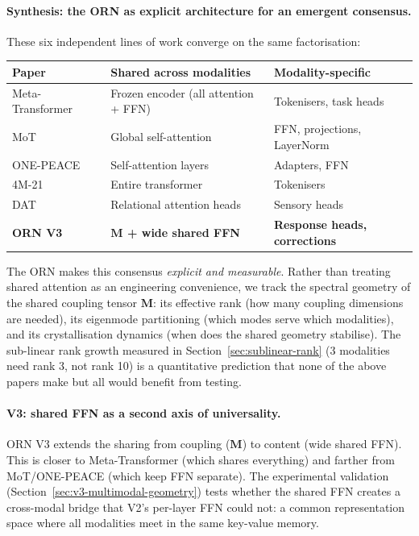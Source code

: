 \documentclass[11pt, a4paper]{article}
\newcommand{\M}{\mathbf{M}}
\theoremstyle{plain}
\theoremstyle{remark}
\begin{document}
\paragraph{Synthesis: the ORN as explicit architecture for an emergent consensus.}
These six independent lines of work converge on the same factorisation:
\begin{center}\small
\begin{tabular}{@{}lll@{}}
\toprule
\textbf{Paper} & \textbf{Shared across modalities} & \textbf{Modality-specific} \\
\midrule
Meta-Transformer~\cite{zhang2023metatransformer} & Frozen encoder (all attention + FFN) & Tokenisers, task heads \\
MoT~\cite{liang2024mot} & Global self-attention & FFN, projections, LayerNorm \\
ONE-PEACE~\cite{wang2023onepeace} & Self-attention layers & Adapters, FFN \\
4M-21~\cite{bachmann2024fourm} & Entire transformer & Tokenisers \\
DAT~\cite{altabaa2024dat} & Relational attention heads & Sensory heads \\
\midrule
\textbf{ORN V3} & \textbf{$\M$ + wide shared FFN} & \textbf{Response heads, corrections} \\
\bottomrule
\end{tabular}
\end{center}

The ORN makes this consensus \emph{explicit and measurable}.
Rather than treating shared attention as an engineering convenience, we track the spectral geometry of the shared coupling tensor $\M$: its effective rank (how many coupling dimensions are needed), its eigenmode partitioning (which modes serve which modalities), and its crystallisation dynamics (when does the shared geometry stabilise).
The sub-linear rank growth measured in Section~\ref{sec:sublinear-rank} (3 modalities need rank 3, not rank 10) is a quantitative prediction that none of the above papers make but all would benefit from testing.

\paragraph{V3: shared FFN as a second axis of universality.}
ORN V3 extends the sharing from coupling ($\M$) to content (wide shared FFN).
This is closer to Meta-Transformer (which shares everything) and farther from MoT/ONE-PEACE (which keep FFN separate).
The experimental validation (Section~\ref{sec:v3-multimodal-geometry}) tests whether the shared FFN creates a cross-modal bridge that V2's per-layer FFN could not: a common representation space where all modalities meet in the same key-value memory.
\end{document}
